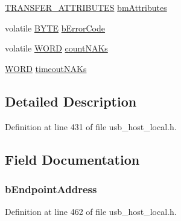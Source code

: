 \begin{DoxyCompactItemize}
\item 
\hyperlink{union_t_r_a_n_s_f_e_r___a_t_t_r_i_b_u_t_e_s}{T\+R\+A\+N\+S\+F\+E\+R\+\_\+\+A\+T\+T\+R\+I\+B\+U\+T\+E\+S} \hyperlink{struct___u_s_b___e_n_d_p_o_i_n_t___i_n_f_o_a7f8f2a62d332545d70f7c784e4e6e620}{bm\+Attributes}
\item 
volatile \hyperlink{_generic_type_defs_8h_a4ae1dab0fb4b072a66584546209e7d58}{B\+Y\+T\+E} \hyperlink{struct___u_s_b___e_n_d_p_o_i_n_t___i_n_f_o_a58eea4dc6f1e1d6e25096ef7cd2ab150}{b\+Error\+Code}
\item 
volatile \hyperlink{_generic_type_defs_8h_a2b0e863dadf920709ec53d9088ee7c91}{W\+O\+R\+D} \hyperlink{struct___u_s_b___e_n_d_p_o_i_n_t___i_n_f_o_a700d4399d3e28b3cfa58631d0db02179}{count\+N\+A\+Ks}
\item 
\hyperlink{_generic_type_defs_8h_a2b0e863dadf920709ec53d9088ee7c91}{W\+O\+R\+D} \hyperlink{struct___u_s_b___e_n_d_p_o_i_n_t___i_n_f_o_afc9c78bad9450d20d01971f83f5e9fe6}{timeout\+N\+A\+Ks}
\end{DoxyCompactItemize}


\subsection{Detailed Description}


Definition at line 431 of file usb\+\_\+host\+\_\+local.\+h.



\subsection{Field Documentation}
\hypertarget{struct___u_s_b___e_n_d_p_o_i_n_t___i_n_f_o_a80a1ec4bf8007a3ee5ff04c08d6f985d}{}
\subsubsection[{b\+Endpoint\+Address}]{ b\+Endpoint\+Address}\label{struct___u_s_b___e_n_d_p_o_i_n_t___i_n_f_o_a80a1ec4bf8007a3ee5ff04c08d6f985d}


Definition at line 462 of file usb\+\_\+host\+\_\+local.\+h.

